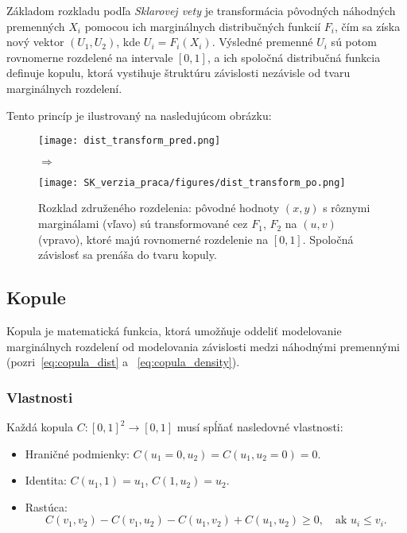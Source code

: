 Základom rozkladu podľa \textit{Sklarovej vety} je transformácia pôvodných náhodných premenných $X_i$ pomocou ich marginálnych distribučných funkcií $F_i$, čím sa získa nový vektor $(U_1, U_2)$, kde $U_i = F_i(X_i)$. Výsledné premenné $U_i$ sú potom rovnomerne rozdelené na intervale $[0,1]$, a ich spoločná distribučná funkcia definuje kopulu, ktorá vystihuje štruktúru závislosti nezávisle od tvaru marginálnych rozdelení.

Tento princíp je ilustrovaný na nasledujúcom obrázku:

\begin{figure}[H]
    \centering
    \begin{minipage}{0.45\linewidth}
        \centering
        \texttt{[image: dist\_transform\_pred.png]}
    \end{minipage}
    \begin{minipage}{0.05\linewidth}
        \centering
        \Huge$\Rightarrow$
    \end{minipage}
    \begin{minipage}{0.45\linewidth}
        \centering
        \texttt{[image: SK\_verzia\_praca/figures/dist\_transform\_po.png]}
    \end{minipage}
    \caption{Rozklad združeného rozdelenia: pôvodné hodnoty $(x, y)$ s rôznymi marginálami (vľavo) sú transformované cez $F_1$, $F_2$ na $(u,v)$ (vpravo), ktoré majú rovnomerné rozdelenie na $[0,1]$. Spoločná závislosť sa prenáša do tvaru kopuly.}
    \label{fig:sklar_transform}
\end{figure}

\subsection{Kopule}
\label{subsec:copulas}

Kopula je matematická funkcia, ktorá umožňuje oddeliť modelovanie marginálnych rozdelení od modelovania závislosti medzi náhodnými premennými (pozri~\ref{eq:copula_dist} a ~\ref{eq:copula_density}).

\subsubsection{Vlastnosti}

Každá kopula $C: [0,1]^2 \to [0,1]$ musí spĺňať nasledovné vlastnosti:

\begin{itemize}
  \item Hraničné podmienky: $C(u_1=0, u_2) = C(u_1, u_2=0) = 0$.
  \item Identita: $C(u_1, 1) = u_1$, $C(1, u_2) = u_2$.
  \item Rastúca:
  \begin{equation}
    C(v_1, v_2) - C(v_1, u_2) - C(u_1, v_2) + C(u_1, u_2) \geq 0, \quad \text{ak } u_i \leq v_i.
  \end{equation}
\end{itemize}


